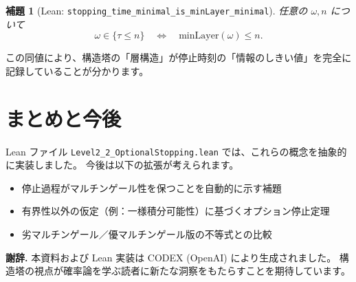 \documentclass[12pt]{ltjsarticle}
\theoremstyle{definition}
\theoremstyle{plain}
\newtheorem{lemma}[definition]{補題}
\begin{document}
\begin{lemma}[Lean: \texttt{stopping\_time\_minimal\_is\_minLayer\_minimal}]
任意の $\omega,n$ について
\[
  \omega \in \{\tau \le n\} \quad \Longleftrightarrow \quad
  \mathrm{minLayer}(\omega) \le n.
\]
\end{lemma}

この同値により、構造塔の「層構造」が停止時刻の「情報のしきい値」を完全に記録していることが分かります。

\section{まとめと今後}

Lean ファイル \texttt{Level2\_2\_OptionalStopping.lean} では、これらの概念を抽象的に実装しました。
今後は以下の拡張が考えられます。
\begin{itemize}
  \item 停止過程がマルチンゲール性を保つことを自動的に示す補題
  \item 有界性以外の仮定（例：一様積分可能性）に基づくオプション停止定理
  \item 劣マルチンゲール／優マルチンゲール版の不等式との比較
\end{itemize}

\bigskip
\noindent\textbf{謝辞.}
本資料および Lean 実装は CODEX (OpenAI) により生成されました。
構造塔の視点が確率論を学ぶ読者に新たな洞察をもたらすことを期待しています。
\end{document}

